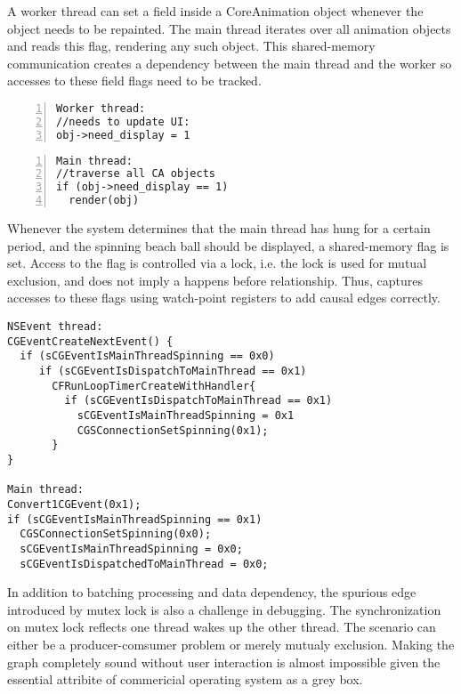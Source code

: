 A worker thread can set a field  inside a CoreAnimation
object whenever the object needs to be repainted. The main thread iterates over
all animation objects and reads this flag, rendering any such object. This
shared-memory communication creates a dependency between the main thread and the
worker so accesses to these field flags need to be tracked.

{\footnotesize\begin{BVerbatim}[baseline=c,numbers=left]
Worker thread:
//needs to update UI:
obj->need_display = 1
\end{BVerbatim}
}
\quad
{\footnotesize\begin{BVerbatim}[baseline=c,numbers=left]
Main thread: 
//traverse all CA objects
if (obj->need_display == 1)
  render(obj)
\end{BVerbatim}
}
\bigskip

Whenever the system determines that the main thread has hung for a certain
period, and the spinning beach ball should be displayed, a shared-memory flag
is set. Access to the flag is controlled via a lock, i.e. the lock is used for
mutual exclusion, and does not imply a happens before relationship. Thus, \xxx
captures accesses to these flags using watch-point registers to add causal edges
correctly.

{\footnotesize \begin{verbatim}
NSEvent thread:
CGEventCreateNextEvent() {
  if (sCGEventIsMainThreadSpinning == 0x0)
     if (sCGEventIsDispatchToMainThread == 0x1)
       CFRunLoopTimerCreateWithHandler{
         if (sCGEventIsDispatchToMainThread == 0x1)
           sCGEventIsMainThreadSpinning = 0x1
           CGSConnectionSetSpinning(0x1);
       }
}

Main thread:
Convert1CGEvent(0x1);
if (sCGEventIsMainThreadSpinning == 0x1)
  CGSConnectionSetSpinning(0x0);
  sCGEventIsMainThreadSpinning = 0x0;
  sCGEventIsDispatchedToMainThread = 0x0;
\end{verbatim}
}

In addition to batching processing and data dependency, the spurious edge
introduced by mutex lock is also a challenge in debugging. The synchronization
on mutex lock reflects one thread wakes up the other thread. The scenario can
either be a producer-comsumer problem or merely mutualy exclusion. Making the
graph completely sound without user interaction is almost impossible given the
essential attribite of commericial operating system as a grey box.

